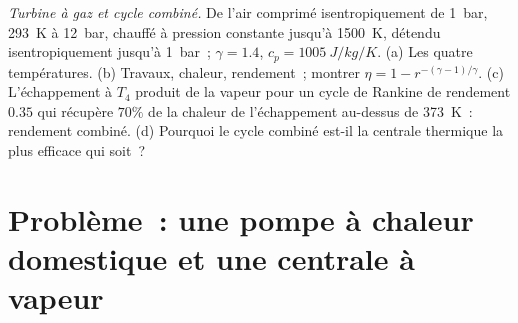 \begin{exercise}[$\star\star\star$]\label{exo:b2:open-systems:12}
\emph{Turbine à gaz et cycle combiné.} De l'air comprimé isentropiquement
de \qty{1}{bar}, \qty{293}{K} à \qty{12}{bar}, chauffé à pression constante
jusqu'à \qty{1500}{K}, détendu isentropiquement jusqu'à \qty{1}{bar}~; $\gamma = 1.4$,
$c_p = \qty{1005}{J/kg/K}$. (a) Les quatre températures. (b) Travaux,
chaleur, rendement~; montrer $\eta = 1 - r^{-(\gamma - 1)/\gamma}$. (c)
L'échappement à $T_4$ produit de la vapeur pour un cycle de Rankine de rendement $0.35$
qui récupère $70\%$ de la chaleur de l'échappement au-dessus de \qty{373}{K}~: rendement
combiné. (d) Pourquoi le cycle combiné est-il la centrale thermique la plus efficace qui soit~?
\end{exercise}

\section{Problème~: une pompe à chaleur domestique et une centrale à vapeur}

